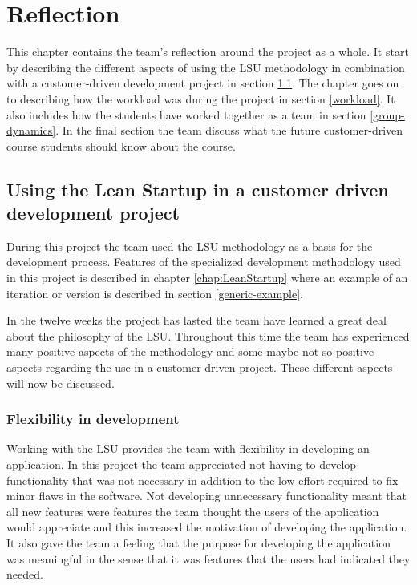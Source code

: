 \chapter{Reflection}
\label{reflection}
This chapter contains the team's reflection around the project as a whole. It start by describing the different aspects of using the \gls{LSU} methodology in combination with a customer-driven development project in section \ref{lean-in-customer-project}. The chapter goes on to describing how the workload was during the project in section \ref{workload}. It also includes how the students have worked together as a team in section \ref{group-dynamics}. In the final section the team discuss what the future customer-driven course students should know about the course.

\section{Using the Lean Startup in a customer driven development project}
\label{lean-in-customer-project}
During this project the team used the \gls{LSU} methodology as a basis for the development process. Features of the specialized development methodology used in this project is described in chapter \ref{chap:LeanStartup} where an example of an iteration or version is described in section \ref{generic-example}.

In the twelve weeks the project has lasted the team have learned a great deal about the philosophy of the \gls{LSU}. Throughout this time the team has experienced many positive aspects of the methodology and some maybe not so positive aspects regarding the use in a customer driven project. These different aspects will now be discussed.

\subsection{Flexibility in development}
Working with the \gls{LSU} provides the team with flexibility in developing an application. In this project the team appreciated not having to develop functionality that was not necessary in addition to the low effort required to fix minor flaws in the software. Not developing unnecessary functionality meant that all new features were features the team thought the users of the application would appreciate and this increased the motivation of developing the application. It also gave the team a feeling that the purpose for developing the application was meaningful in the sense that it was features that the users had indicated they needed. 

